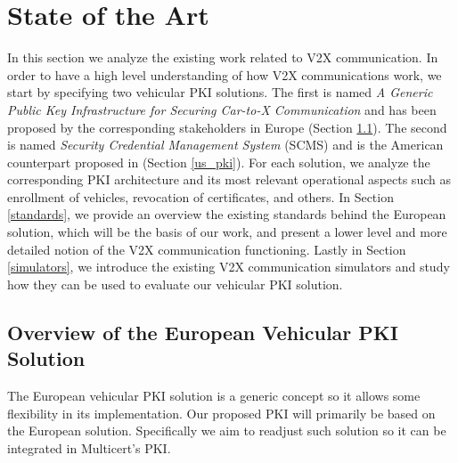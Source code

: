 
\chapter{State of the Art}
\label{related_work}

In this section we analyze the existing work related to V2X communication. In order to have a high level understanding of how V2X communications work, we
start by specifying two vehicular PKI solutions. The first is named \textit{A Generic Public Key Infrastructure for Securing Car-to-X Communication} and has been proposed by the corresponding stakeholders in Europe \cite{generic_eu} \cite{etsi_formats} \cite{wow} (Section \ref{etsi_design}). The second is named \textit{Security Credential Management System} (SCMS) and is the American counterpart proposed in \cite{scms} (Section \ref{us_pki}). For each solution, we analyze the corresponding PKI architecture and its most relevant operational aspects such as enrollment of vehicles, revocation of certificates, and others. In Section \ref{standards}, we provide an overview the existing standards behind the European solution, which will be the basis of our work, and present a lower level and more detailed notion of the V2X communication functioning. Lastly in Section \ref{simulators}, we introduce the existing V2X communication simulators and study how they can be used to evaluate our vehicular PKI solution. 


\section{Overview of the European Vehicular PKI Solution}
\label{etsi_design}
The European vehicular PKI solution is a generic concept so it allows some flexibility in its implementation. Our proposed PKI will primarily be based on the European solution. Specifically we aim to readjust such solution so it can be integrated in Multicert's PKI. 


